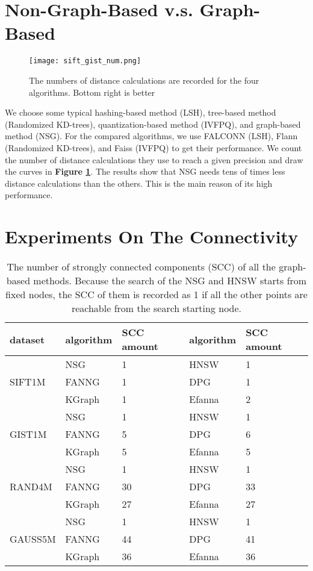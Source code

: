 \documentclass{vldb}
\begin{document}
\begin{appendix}
\section{Non-Graph-Based v.s. Graph-Based}
\begin{figure}[t]
\begin{center}
\texttt{[image: sift\_gist\_num.png]}
\end{center}
   \caption{The numbers of distance calculations are recorded for the four algorithms. Bottom right is better}
\label{sift_gist_num}
\end{figure}
We choose some typical hashing-based method (LSH), tree-based method (Randomized KD-trees), quantization-based method (IVFPQ), and graph-based method (NSG). For the compared algorithms, we use FALCONN (LSH), Flann (Randomized KD-trees), and Faiss (IVFPQ) to get their performance. We count the number of distance calculations they use to reach a given precision and draw the curves in \textbf{Figure \ref{sift_gist_num}}. The results show that NSG needs tens of times less distance calculations than the others. This is the main reason of its high performance. 

\section{Experiments On The Connectivity}
\begin{table}[t]\scriptsize
	\caption{The number of strongly connected components (SCC) of all the graph-based methods. Because the search of the NSG and HNSW starts from fixed nodes, the SCC of them is recorded as 1 if all the other points are reachable from the search starting node.}
	\label{graph_scc}
	\centering
	\begin{tabular}{|p{1.2cm}<{\centering}|p{1.1cm}<{\centering}|p{1.5cm}<{\centering}|p{1.1cm}<{\centering}|p{1.3cm}<{\centering}|}
		\hline
		dataset &  algorithm & SCC amount &algorithm &SCC amount\\
		\hline
		\multirow{3}{*}{SIFT1M} 
		&NSG & 1 & HNSW & 1 \\
		\cline{2-5}
		&FANNG & 1 & DPG & 1 \\
		\cline{2-5}
		&KGraph & 1 & Efanna & 2 \\
		\hline
		\multirow{3}{*}{GIST1M} 
		&NSG & 1 & HNSW & 1\\
		\cline{2-5}
		&FANNG & 5 & DPG & 6 \\
		\cline{2-5}
		&KGraph & 5 & Efanna & 5 \\
		\hline
		\multirow{3}{*}{RAND4M} 
		&NSG & 1 & HNSW & 1\\
		\cline{2-5}
		&FANNG & 30 & DPG & 33 \\
		\cline{2-5}
		&KGraph & 27 & Efanna & 27 \\
		\hline
		\multirow{3}{*}{GAUSS5M} 
		&NSG & 1 & HNSW & 1\\
		\cline{2-5}
		&FANNG & 44 & DPG & 41 \\
		\cline{2-5}
		&KGraph & 36 & Efanna & 36 \\
		\hline
	\end{tabular}
\end{table}


\end{appendix}
\end{document}

